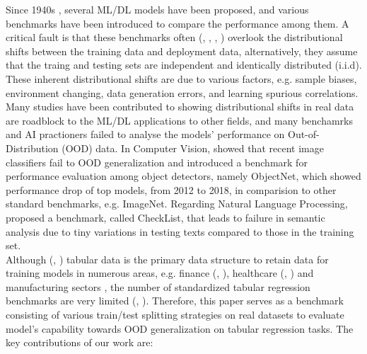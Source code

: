 \documentclass[12pt,a4paper]{article}
\theoremstyle{definition}
\theoremstyle{remark}
\begin{document}
\noindent
Since 1940s \cite{russell2021aima}, several ML/DL models have been proposed, and various benchmarks have been introduced to compare the performance among them. 
A critical fault is that these benchmarks often (\cite{malinin2021shifts}, \cite{tamang2025handlingoutofdistributiondatasurvey}, \cite{quinonero2009datasetshift}, \cite{koh2021wilds}) overlook the distributional shifts between the training data and deployment data, alternatively, they assume that the traing and testing sets are independent and identically distributed (i.i.d).
These inherent distributional shifts are due to various factors, e.g. \cite{tamang2025handlingoutofdistributiondatasurvey} sample biases, environment changing, data generation errors, and \cite{gulrajani2020searchlostdomaingeneralization} learning spurious correlations.
Many studies have been contributed to showing \cite{gulrajani2020searchlostdomaingeneralization} distributional shifts in real data are roadblock to the ML/DL applications to other fields, and many \cite{deeva2023evaluating} benchamrks and \cite{malinin2022shifts20extendingdataset} AI practioners failed to analyse the models' performance on Out-of-Distribution (OOD) data. In Computer Vision, \cite{taori2020measuringrobustnessnaturaldistribution} showed that recent image classifiers fail to OOD generalization
and \cite{NEURIPS2019_97af07a1} introduced a benchmark for performance evaluation among object detectors, namely ObjectNet, which showed performance drop of top models, from 2012 to 2018, in comparision to other standard benchmarks, e.g. ImageNet.
Regarding Natural Language Processing, \cite{ribeiro-etal-2020-beyond} proposed a benchmark, called CheckList, that leads to failure in semantic analysis due to tiny variations in testing texts compared to those in the training set.
\\

\noindent
Although (\cite{kolesnikov2023wildtabbenchmarkoutofdistributiongeneralization}, \cite{Borisov_2024}) tabular data is the primary data structure to retain data for training models in numerous areas, e.g. finance (\cite{heaton2018deep}, \cite{ozbayoglu2020deeplearningfinancialapplications}),
healthcare (\cite{NAYYAR202123}, \cite{Rajkomar2018ScalableAA}) and manufacturing sectors \cite{leukel2021adoption}, the number of standardized tabular regression benchmarks are very limited (\cite{grinsztajn2022treebasedmodelsoutperformdeep}, \cite{kolesnikov2023wildtabbenchmarkoutofdistributiongeneralization}).
Therefore, this paper serves as a benchmark consisting of various train/test splitting strategies on real datasets to evaluate model's capability towards OOD generalization on tabular regression tasks. The key contributions of our work are:
\end{document}
